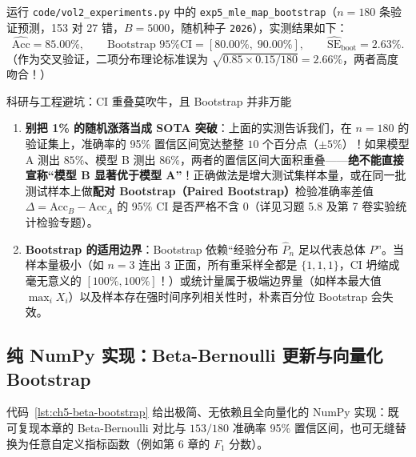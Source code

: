 运行 \texttt{code/vol2\_experiments.py} 中的 \texttt{exp5\_mle\_map\_bootstrap}（$n=180$ 条验证预测，153 对 27 错，$B=5000$，随机种子 \texttt{2026}），实测结果如下：
\[
  \widehat{\text{Acc}} = 85.00\%, \qquad
  \text{Bootstrap 95\% CI} = \mathbf{[80.00\%,\; 90.00\%]}, \qquad
  \widehat{\mathrm{SE}}_{\text{boot}} = \mathbf{2.63\%}.
\]
（作为交叉验证，二项分布理论标准误为 $\sqrt{0.85 \times 0.15 / 180} = 2.66\%$，两者高度吻合！）

\begin{failBox}{科研与工程避坑：CI 重叠莫吹牛，且 Bootstrap 并非万能}
\begin{enumerate}
  \item \textbf{别把 1\% 的随机涨落当成 SOTA 突破}：上面的实测告诉我们，在 $n=180$ 的验证集上，准确率的 95\% 置信区间宽达整整 $10$ 个百分点（$\pm 5\%$）！如果模型 A 测出 $85\%$、模型 B 测出 $86\%$，两者的置信区间大面积重叠——\textbf{绝不能直接宣称“模型 B 显著优于模型 A”}！正确做法是增大测试集样本量，或在同一批测试样本上做\textbf{配对 Bootstrap（Paired Bootstrap）}检验准确率差值 $\Delta = \text{Acc}_B - \text{Acc}_A$ 的 95\% CI 是否严格不含 $0$（详见习题 5.8 及第 7 卷实验统计检验专题）。
  \item \textbf{Bootstrap 的适用边界}：Bootstrap 依赖“经验分布 $\hat{P}_n$ 足以代表总体 $P$”。当样本量极小（如 $n=3$ 连出 3 正面，所有重采样全都是 $\{1,1,1\}$，CI 坍缩成毫无意义的 $[100\%, 100\%]$！）或统计量属于极端边界量（如样本最大值 $\max_i X_i$）以及样本存在强时间序列相关性时，朴素百分位 Bootstrap 会失效。
\end{enumerate}
\end{failBox}

\subsection{纯 NumPy 实现：Beta-Bernoulli 更新与向量化 Bootstrap}
\label{subsec:ch5-code}

代码~\ref{lst:ch5-beta-bootstrap} 给出极简、无依赖且全向量化的 NumPy 实现：既可复现本章的 Beta-Bernoulli 对比与 $153/180$ 准确率 95\% 置信区间，也可无缝替换为任意自定义指标函数（例如第 6 章的 $F_1$ 分数）。

